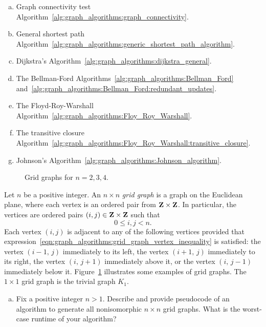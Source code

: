\begin{problem}
\begin{enumerate}[(a)]
  \item Graph connectivity test
    Algorithm~\ref{alg:graph_algorithms:graph_connectivity}.

  \item General shortest path
    Algorithm~\ref{alg:graph_algorithms:generic_shortest_path_algorithm}.

  \item Dijkstra's
    Algorithm~\ref{alg:graph_algorithms:dijkstra_general}.

  \item The Bellman-Ford
    Algorithms~\ref{alg:graph_algorithms:Bellman_Ford}
    and~\ref{alg:graph_algorithms:Bellman_Ford:redundant_updates}.

  \item The Floyd-Roy-Warshall
    Algorithm~\ref{alg:graph_algorithms:Floy_Roy_Warshall}.

  \item The transitive closure
    Algorithm~\ref{alg:graph_algorithms:Floy_Roy_Warshall:transitive_closure}.

  \item Johnson's
    Algorithm~\ref{alg:graph_algorithms:Johnson_algorithm}.
  \end{enumerate}

\begin{figure}[!htbp]
\centering

\caption{Grid graphs for $n = 2, 3, 4$.}
\label{fig:graph_algorithms:grid_graphs}
\end{figure}

\item Let $n$ be a positive integer. An $n \times n$
  \emph{grid graph} is a graph on the
  Euclidean plane, where each vertex is an ordered pair
  from $\mathbf{Z} \times \mathbf{Z}$. In particular, the vertices are ordered pairs
  $(i,j) \in \mathbf{Z} \times \mathbf{Z}$ such that
  \begin{equation}
  \label{eqn:graph_algorithms:grid_graph_vertex_inequality}
  0 \leq i,j < n.
  \end{equation}
  Each vertex $(i,j)$ is adjacent to any of the following vertices
  provided that
  expression~\eqref{eqn:graph_algorithms:grid_graph_vertex_inequality}
  is satisfied: the vertex $(i-1,\, j)$ immediately to its left, the
  vertex $(i+1,\, j)$ immediately to its right, the vertex
  $(i,\, j+1)$ immediately above it, or the vertex $(i,\, j-1)$
  immediately below it. Figure~\ref{fig:graph_algorithms:grid_graphs}
  illustrates some examples of grid graphs. The $1 \times 1$ grid
  graph is the trivial graph $K_1$.
  \begin{enumerate}[(a)]
  \item Fix a positive integer $n > 1$. Describe and provide
    pseudocode of an algorithm to generate all nonisomorphic
    $n \times n$ grid graphs. What is the worst-case runtime of your
    algorithm?


\end{enumerate}
\end{problem}
